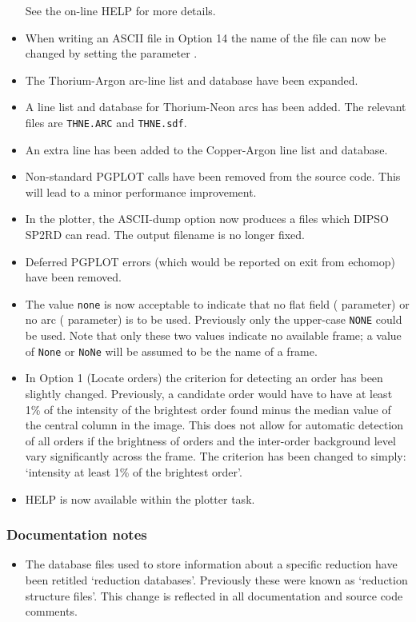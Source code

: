 \begin{itemize}
   See the on-line HELP for more details.
\item When writing an ASCII file in Option 14 the name of the file can
   now be changed by setting the parameter
   .
\item The Thorium-Argon arc-line list and database have been expanded.
\item A line list and database for Thorium-Neon arcs has been added.
   The relevant files are \verb+THNE.ARC+ and \verb+THNE.sdf+.
\item An extra line has been added to the Copper-Argon line list and
   database.
\item Non-standard PGPLOT calls have been removed from the source code.
   This will lead to a minor performance improvement.
\item In the plotter, the ASCII-dump option now produces a files which
   DIPSO SP2RD can read.  The output filename is no longer fixed.
\item Deferred PGPLOT errors (which would be reported on exit from
   {\sc echomop}) have been removed.
\item The value \verb+none+ is now acceptable to indicate that no flat
   field ( parameter) or no arc
   ( parameter) is to  be used.
   Previously only the upper-case \verb+NONE+ could be used.  Note that
   only these two values indicate no available frame; a value of
   \verb+None+ or \verb+NoNe+ will be assumed to be the name of a frame.
\item In Option 1 (Locate orders) the criterion for detecting an order
   has been slightly changed.  Previously, a candidate order would
   have to have at least 1\% of the intensity of the brightest order
   found minus the median value of the central column in the image.
   This does not allow for automatic detection of all orders if the
   brightness of orders and the inter-order background level vary
   significantly across the frame.  The criterion has been changed
   to simply: `intensity at least 1\% of the brightest order'.
\item HELP is now available within the plotter task.
\end{itemize}

\subsubsection{Documentation notes}

\begin{itemize}
\item The database files used to store information about a specific
   reduction have been retitled `reduction databases'.  Previously
   these were known as `reduction structure files'.  This change is
   reflected in all documentation and source code comments.
\end{itemize}

